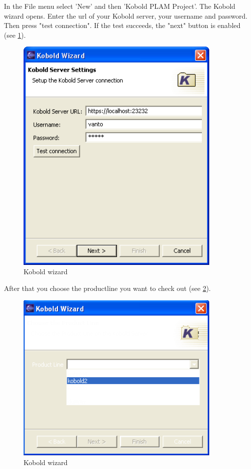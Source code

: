 In the File menu select 'New' and then 'Kobold PLAM Project'. The Kobold wizard opens.
Enter the url of your Kobold server, your username and password. Then press
"test connection". If the test succeeds, the "next" button is enabled (see \ref{wizard1}).

\begin{figure}[h!]
\begin{center}
\includegraphics[width=10cm]{wizard1.png}
   \caption{Kobold wizard}
\label{wizard1}
\end{center}
\end{figure}\par

After that you choose the productline you want to check out (see \ref{wizard2}).

\begin{figure}[h!]
\begin{center}
\includegraphics[width=10cm]{wizard2.png}
   \caption{Kobold wizard}
\label{wizard2}
\end{center}
\end{figure}\par

